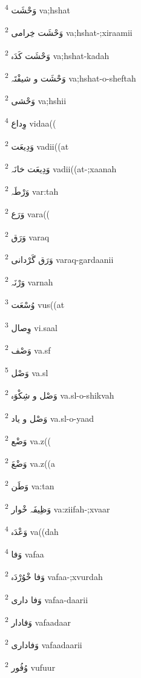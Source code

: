 \documentclass[12pt]{article}
\begin{document}
\begin{multicols}{5}
{\ur وَحْشَت}   \textsuperscript{4} va;hshat

{\ur وَحْشَت خِرامی}   \textsuperscript{2} va;hshat-;xiraamii

{\ur وَحْشَت کَدَہ}   \textsuperscript{2} va;hshat-kadah

{\ur وَحْشَت و شیفْتَہ}   \textsuperscript{2} va;hshat-o-sheftah

{\ur وَحْشی}   \textsuperscript{2} va;hshii

{\ur وِداع}   \textsuperscript{4} vidaa((

{\ur وَدِیعَت}   \textsuperscript{2} vadii((at

{\ur وَدِیعَت خانَہ}   \textsuperscript{2} vadii((at-;xaanah

{\ur وَرْطَہ}   \textsuperscript{2} var:tah

{\ur وَرَع}   \textsuperscript{2} vara((

{\ur وَرَق}   \textsuperscript{2} varaq

{\ur وَرَق گَرْدانی}   \textsuperscript{2} varaq-gardaanii

{\ur وَرْنَہ}   \textsuperscript{2} varnah

{\ur وُسْعَت}   \textsuperscript{3} vus((at

{\ur وِصال}   \textsuperscript{3} vi.saal

{\ur وَصْف}   \textsuperscript{2} va.sf

{\ur وَصْل}   \textsuperscript{5} va.sl

{\ur وَصْل و شِکْوَہ}   \textsuperscript{2} va.sl-o-shikvah

{\ur وَصْل و یاد}   \textsuperscript{2} va.sl-o-yaad

{\ur وَضْع}   \textsuperscript{2} va.z((

{\ur وَضْعَ}   \textsuperscript{2} va.z((a

{\ur وَطَن}   \textsuperscript{2} va:tan

{\ur وَظِیفَہ خْوار}   \textsuperscript{2} va:ziifah-;xvaar

{\ur وَعْدَہ}   \textsuperscript{4} va((dah

{\ur وَفا}   \textsuperscript{4} vafaa

{\ur وَفا خْوُرْدَہ}   \textsuperscript{2} vafaa-;xvurdah

{\ur وَفا داری}   \textsuperscript{2} vafaa-daarii

{\ur وَفادار}   \textsuperscript{2} vafaadaar

{\ur وَفاداری}   \textsuperscript{2} vafaadaarii

{\ur وُفُور}   \textsuperscript{2} vufuur


\end{multicols}
\end{document}
